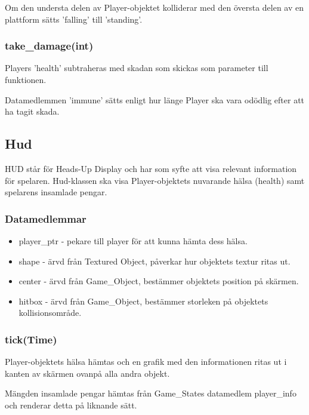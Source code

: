\documentclass{TDP005mall}
\begin{document}
Om den understa delen av Player-objektet kolliderar med den översta delen av en plattform sätts 'falling' till 'standing'.


\subsubsection{take\_damage(int)}
Players 'health' subtraheras med skadan som skickas som parameter till funktionen. 

Datamedlemmen 'immune' sätts enligt hur länge Player ska vara odödlig efter att ha tagit skada.


\subsection{Hud}
HUD står för Heads-Up Display och har som syfte att visa relevant information för spelaren. 
Hud-klassen ska visa Player-objektets nuvarande hälsa (health) samt spelarens insamlade pengar.

\subsubsection{Datamedlemmar}
\begin{itemize}
\item player\_ptr - pekare till player för att kunna hämta dess hälsa.
\item shape - ärvd från Textured Object, påverkar hur objektets textur ritas ut.
\item center - ärvd från Game\_Object, bestämmer objektets position på skärmen.
\item hitbox - ärvd från Game\_Object, bestämmer storleken på objektets kollisionsområde.
\end{itemize}

\subsubsection{tick(Time)}
Player-objektets hälsa hämtas och en grafik med den informationen ritas ut i kanten av skärmen ovanpå alla andra objekt.

Mängden insamlade pengar hämtas från Game\_States datamedlem player\_info och renderar detta på liknande sätt. 
\end{document}
